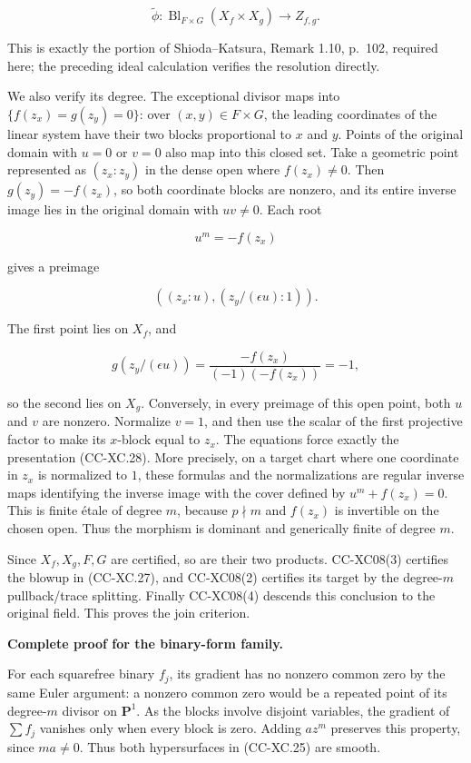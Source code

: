 \[
 \widetilde\phi:\operatorname{Bl}_{F\times G}(X_f\times X_g)
                     \longrightarrow Z_{f,g}.
 \tag{CC-XC.27}
\]

This is exactly the portion of Shioda--Katsura, Remark 1.10, p.~102,
required here; the preceding ideal calculation verifies the resolution
directly.

We also verify its degree. The exceptional divisor maps into
\(\{f(z_x)=g(z_y)=0\}\): over \((x,y)\in F\times G\), the leading
coordinates of the linear system have their two blocks proportional to
\(x\) and \(y\). Points of the original domain with \(u=0\) or \(v=0\)
also map into this closed set. Take a geometric point represented as
\((z_x:z_y)\) in the dense open where \(f(z_x)\ne0\). Then
\(g(z_y)=-f(z_x)\), so both coordinate blocks are nonzero, and its
entire inverse image lies in the original domain with \(uv\ne0\). Each
root

\[
 u^m=-f(z_x)
\]

gives a preimage

\[
 ((z_x:u),(z_y/(\epsilon u):1)).
 \tag{CC-XC.28}
\]

The first point lies on \(X_f\), and

\[
 g(z_y/(\epsilon u))
 =\frac{-f(z_x)}{(-1)(-f(z_x))}=-1,
\]

so the second lies on \(X_g\). Conversely, in every preimage of this
open point, both \(u\) and \(v\) are nonzero. Normalize \(v=1\), and
then use the scalar of the first projective factor to make its
\(x\)-block equal to \(z_x\). The equations force exactly the
presentation (CC-XC.28). More precisely, on a target chart where one
coordinate in \(z_x\) is normalized to \(1\), these formulas and the
normalizations are regular inverse maps identifying the inverse image
with the cover defined by \(u^m+f(z_x)=0\). This is finite étale of
degree \(m\), because \(p\nmid m\) and \(f(z_x)\) is invertible on the
chosen open. Thus the morphism is dominant and generically finite of
degree \(m\).

Since \(X_f,X_g,F,G\) are certified, so are their two products.
CC-XC08(3) certifies the blowup in (CC-XC.27), and CC-XC08(2) certifies
its target by the degree-\(m\) pullback/trace splitting. Finally
CC-XC08(4) descends this conclusion to the original field. This proves
the join criterion.

\textbf{Complete proof for the binary-form family.}

For each squarefree binary \(f_j\), its gradient has no nonzero common
zero by the same Euler argument: a nonzero common zero would be a
repeated point of its degree-\(m\) divisor on \(\mathbf P^1\). As the
blocks involve disjoint variables, the gradient of \(\sum f_j\) vanishes
only when every block is zero. Adding \(a z^m\) preserves this property,
since \(ma\ne0\). Thus both hypersurfaces in (CC-XC.25) are smooth.

